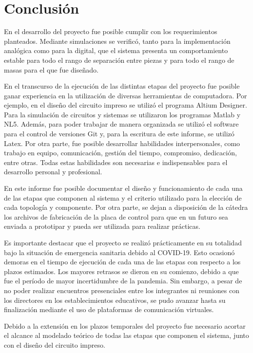 \chapter{Conclusión}  \label{cap:Conclusión}

En el desarrollo del proyecto fue posible cumplir con los requerimientos planteados. Mediante simulaciones se verificó, tanto para la implementación analógica como para la digital, que el sistema presenta un comportamiento estable para todo el rango de separación entre piezas y para todo el rango de masas para el que fue diseñado. 

En el transcurso de la ejecución de las distintas etapas del proyecto fue posible ganar experiencia en la utilización de diversas herramientas de computadora. Por ejemplo, en el diseño del circuito impreso se utilizó el programa Altium Designer. Para la simulación de circuitos y sistemas se utilizaron los programas Matlab y NL5. Además, para poder trabajar de manera organizada se utilizó el software para el control de versiones Git y, para la escritura de este informe, se utilizó Latex. Por otra parte, fue posible desarrollar habilidades interpersonales, como trabajo en equipo, comunicación, gestión del tiempo, compromiso, dedicación, entre otras. Todas estas habilidades son necesarias e indispensables para el desarrollo personal y profesional.

En este informe fue posible documentar el diseño y funcionamiento de cada una de las etapas que componen al sistema y el criterio utilizado para la elección de cada topología y componente. Por otra parte, se dejan a disposición de la cátedra  los archivos de fabricación de la placa de control para que en un futuro sea enviada a prototipar y pueda ser utilizada para realizar prácticas.

Es importante destacar que el proyecto se realizó prácticamente en su totalidad bajo la situación de emergencia sanitaria debido al COVID-19. Esto ocasionó demoras en el tiempo de ejecución de cada una de las etapas con respecto a los plazos estimados. Los mayores retrasos se dieron en su comienzo, debido a que fue el período de mayor incertidumbre de la pandemia. Sin embargo, a pesar de no poder realizar encuentros presenciales entre los integrantes ni reuniones con los directores en los establecimientos educativos, se pudo avanzar hasta su finalización  mediante el uso de plataformas de comunicación virtuales.

Debido a la extensión en los plazos temporales del proyecto fue necesario acortar el alcance al modelado teórico de todas las etapas que componen el sistema, junto con el diseño del circuito impreso.

